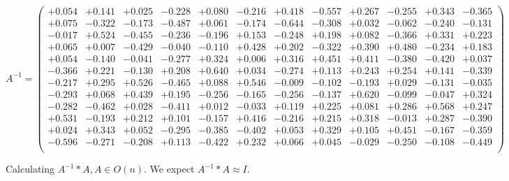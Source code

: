 \documentclass[9pt]{article}
\theoremstyle{plain}
\theoremstyle{definition}
\theoremstyle{remark}
\numberwithin{equation}{section}
\begin{document}
$A^{-1} = \left(
\begin{array}{
cccccccccccc}
+0.054 & +0.141 & +0.025 & -0.228 & +0.080 & -0.216 & +0.418 & -0.557 & +0.267 & -0.255 & +0.343 & -0.365 \\
+0.075 & -0.322 & -0.173 & -0.487 & +0.061 & -0.174 & -0.644 & -0.308 & +0.032 & -0.062 & -0.240 & -0.131 \\
-0.017 & +0.524 & -0.455 & -0.236 & -0.196 & +0.153 & -0.248 & +0.198 & +0.082 & -0.366 & +0.331 & +0.223 \\
+0.065 & +0.007 & -0.429 & -0.040 & -0.110 & +0.428 & +0.202 & -0.322 & +0.390 & +0.480 & -0.234 & +0.183 \\
+0.054 & -0.140 & -0.041 & -0.277 & +0.324 & +0.006 & +0.316 & +0.451 & +0.411 & -0.380 & -0.420 & +0.037 \\
-0.366 & +0.221 & -0.130 & +0.208 & +0.640 & +0.034 & -0.274 & +0.113 & +0.243 & +0.254 & +0.141 & -0.339 \\
-0.217 & +0.295 & +0.526 & -0.465 & +0.088 & +0.546 & -0.009 & -0.102 & -0.193 & +0.029 & -0.131 & -0.035 \\
-0.293 & +0.068 & +0.439 & +0.195 & -0.256 & -0.165 & -0.256 & -0.137 & +0.620 & -0.099 & -0.047 & +0.324 \\
-0.282 & -0.462 & +0.028 & -0.411 & +0.012 & -0.033 & +0.119 & +0.225 & +0.081 & +0.286 & +0.568 & +0.247 \\
+0.531 & -0.193 & +0.212 & +0.101 & -0.157 & +0.416 & -0.216 & +0.215 & +0.318 & -0.013 & +0.287 & -0.390 \\
+0.024 & +0.343 & +0.052 & -0.295 & -0.385 & -0.402 & +0.053 & +0.329 & +0.105 & +0.451 & -0.167 & -0.359 \\
-0.596 & -0.271 & -0.208 & +0.113 & -0.422 & +0.232 & +0.066 & +0.045 & -0.029 & -0.250 & -0.108 & -0.449 \\
\end{array}
\right)$ \newline 

Calculating $A^{-1} *A  ,  A \in O(n)$.   We expect $A^{-1} *A  \approx I$. 
\end{document}
